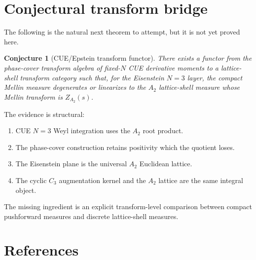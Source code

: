 \documentclass[11pt]{article}
\newtheorem{conjecture}[theorem]{Conjecture}
\begin{document}
\section{Conjectural transform bridge}

The following is the natural next theorem to attempt, but it is not yet proved here.

\begin{conjecture}[CUE/Epstein transform functor]
There exists a functor from the phase-cover transform algebra of fixed-$N$ CUE derivative moments to a lattice-shell transform category such that, for the Eisenstein $N=3$ layer, the compact Mellin measure degenerates or linearizes to the $A_2$ lattice-shell measure whose Mellin transform is $Z_{A_2}(s)$.
\end{conjecture}

The evidence is structural:
\begin{enumerate}[label=(\roman*)]
\item CUE $N=3$ Weyl integration uses the $A_2$ root product.
\item The phase-cover construction retains positivity which the quotient loses.
\item The Eisenstein plane is the universal $A_2$ Euclidean lattice.
\item The cyclic $C_3$ augmentation kernel and the $A_2$ lattice are the same integral object.
\end{enumerate}
The missing ingredient is an explicit transform-level comparison between compact pushforward measures and discrete lattice-shell measures.

\section{References}
\end{document}
